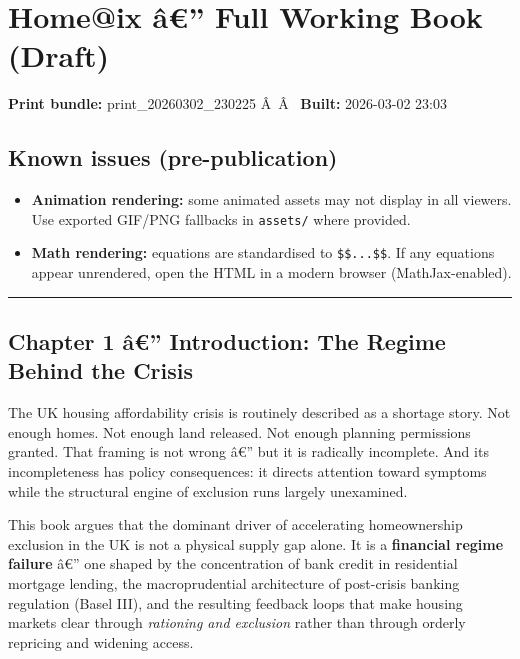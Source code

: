 \section{Home@ix â€'' Full Working Book
(Draft)}\label{homeix-uxe2-full-working-book-draft}

\textbf{Print bundle:} print\_20260302\_230225 Â~\textbar Â~
\textbf{Built:} 2026-03-02 23:03

\subsection{Known issues
(pre-publication)}\label{known-issues-pre-publication}

\begin{itemize}
\tightlist
\item
  \textbf{Animation rendering:} some animated assets may not display in
  all viewers. Use exported GIF/PNG fallbacks in \texttt{assets/} where
  provided.
\item
  \textbf{Math rendering:} equations are standardised to
  \texttt{\$\$...\$\$}. If any equations appear unrendered, open the
  HTML in a modern browser (MathJax-enabled).
\end{itemize}

\begin{center}\rule{0.5\linewidth}{0.5pt}\end{center}

\protect{}\label{my-new-section-title}
\protect{}\label{chapter-1}
\subsection{Chapter 1 â€'' Introduction: The Regime Behind the
Crisis}\label{chapter-1-uxe2-introduction-the-regime-behind-the-crisis}

The UK housing affordability crisis is routinely described as a shortage
story. Not enough homes. Not enough land released. Not enough planning
permissions granted. That framing is not wrong â€'' but it is radically
incomplete. And its incompleteness has policy consequences: it directs
attention toward symptoms while the structural engine of exclusion runs
largely unexamined.

This book argues that the dominant driver of accelerating homeownership
exclusion in the UK is not a physical supply gap alone. It is a
\textbf{financial regime failure} â€'' one shaped by the concentration
of bank credit in residential mortgage lending, the macroprudential
architecture of post-crisis banking regulation (Basel III), and the
resulting feedback loops that make housing markets clear through
\emph{rationing and exclusion} rather than through orderly repricing and
widening access.

